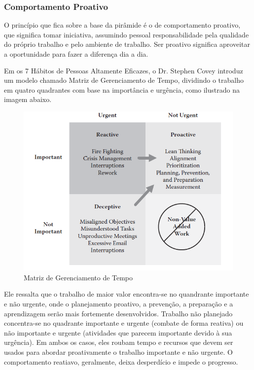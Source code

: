 \subsubsection[Comportamento Proativo]{Comportamento Proativo}

O princípio que fica sobre a base da pirâmide é o de comportamento proativo, que significa tomar iniciativa, assumindo pessoal responsabilidade pela qualidade do próprio trabalho e pelo ambiente de trabalho. Ser proativo significa aproveitar a oportunidade para fazer a diferença dia a dia.

Em os 7 Hábitos de Pessoas Altamente Eficazes, o Dr. Stephen Covey introduz um modelo chamado Matriz de Gerenciamento de Tempo, dividindo o trabalho em quatro quadrantes com base na importância e urgência, como ilustrado na imagem abaixo.

\begin{figure}[h]
		\centering
		\label{fig01}
			\includegraphics[scale=0.9]{figuras/matrizcomportamento.png}
		\caption{Matriz de Gerenciamento de Tempo}
\end{figure}

Ele ressalta que o trabalho de maior valor encontra-se no quandrante importante e não urgente, onde o planejamento proativo, a prevenção, a preparação e a aprendizagem serão mais fortemente desenvolvidos. Trabalho não planejado concentra-se no quadrante importante e urgente (combate de forma reativa) ou não importante e urgente (atividades que parecem importante devido à sua urgência). Em ambos os casos, eles roubam tempo e recursos que devem ser usados para abordar proativamente o trabalho importante e não urgente. O comportamento reatiavo, geralmente, deixa desperdício e impede o progresso. 

